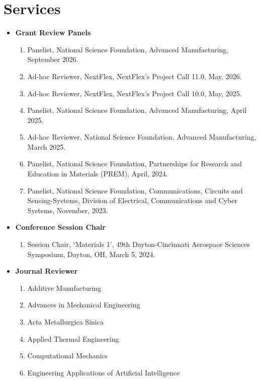 \documentclass[11pt, letterpaper]{article}
\begin{document}
\section{Services}
    \begin{itemize}
        \ifdefined\isinternal
        \item \textbf{Grant Review Panels}
        \begin{enumerate}[label=\arabic*., itemsep=-1pt, topsep=2pt]    
            \item Panelist, National Science Foundation, Advanced Manufacturing, September 2026.
            \item Ad-hoc Reviewer, NextFlex, NextFlex's Project Call 11.0, May, 2026.
            \item Ad-hoc Reviewer, NextFlex, NextFlex's Project Call 10.0, May, 2025.
            \item Panelist, National Science Foundation, Advanced Manufacturing, April 2025.
            \item Ad-hoc Reviewer, National Science Foundation, Advanced Manufacturing, March 2025.
            \item Panelist, National Science Foundation, Partnerships for Research and Education in Materials (PREM), April, 2024.
            \item Panelist, National Science Foundation, Communications, Circuits and Sensing-Systems, Division of Electrical, Communications and Cyber Systems, November, 2023.
        \end{enumerate}
        \fi
        \item \textbf{Conference Session Chair}
        \begin{enumerate}[label=\arabic*., itemsep=-1pt, topsep=2pt]    
            \item Session Chair, ‘Materials 1’, 49th Dayton-Cincinnati Aerospace Sciences Symposium, Dayton, OH, March 5, 2024.
        \end{enumerate}
        \item \textbf{Journal Reviewer}
        \begin{enumerate}
            \item Additive Manufacturing
            \item Advances in Mechanical Engineering
            \item Acta Metallurgica Sinica
            \item Applied Thermal Engineering
            \item Computational Mechanics
            \item Engineering Applications of Artificial Intelligence

\end{enumerate}
\end{itemize}
\end{document}
